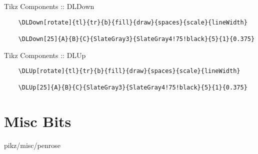 \documentclass[9pt,xcolor={svgnames, x11names}]{beamer}
\begin{document}
\begin{frame}[fragile]{Tikz Components :: DLDown}
	
	\footnotesize
	\begin{verbatim}
    \DLDown[rotate]{tl}{tr}{b}{fill}{draw}{spaces}{scale}{lineWidth}

    \DLDown[25]{A}{B}{C}{SlateGray3}{SlateGray4!75!black}{5}{1}{0.375}
  \end{verbatim}
	
	
\end{frame}

\begin{frame}[fragile]{Tikz Components :: DLUp}
	
	\footnotesize
	\begin{verbatim}
    \DLUp[rotate]{tl}{tr}{b}{fill}{draw}{spaces}{scale}{lineWidth}

    \DLUp[25]{A}{B}{C}{SlateGray3}{SlateGray4!75!black}{5}{1}{0.375}
  \end{verbatim}
	
	
\end{frame}




\section{Misc Bits}


\begin{frame}{pikz/misc/penrose}
	
\end{frame}
\end{document}

